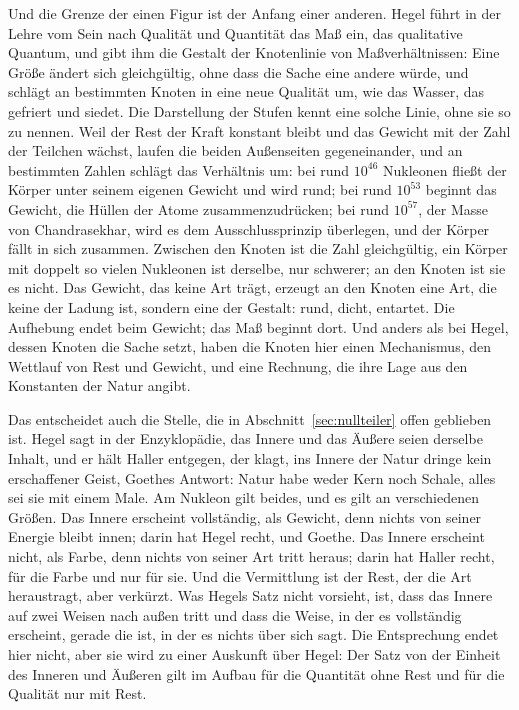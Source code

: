 \documentclass[11pt,a4paper]{article}
\newcommand{\Randlesart}{\marginpar{\raggedright\footnotesize\textcolor{lesart}{$\bigcirc$\,Lesart}}}
\begin{document}
\Randlesart Und die Grenze der einen Figur ist der Anfang einer anderen. Hegel führt in der Lehre vom Sein nach Qualität und Quantität das Maß ein, das qualitative Quantum, und gibt ihm die Gestalt der Knotenlinie von Maßverhältnissen: Eine Größe ändert sich gleichgültig, ohne dass die Sache eine andere würde, und schlägt an bestimmten Knoten in eine neue Qualität um, wie das Wasser, das gefriert und siedet. Die Darstellung der Stufen kennt eine solche Linie, ohne sie so zu nennen. Weil der Rest der Kraft konstant bleibt und das Gewicht mit der Zahl der Teilchen wächst, laufen die beiden Außenseiten gegeneinander, und an bestimmten Zahlen schlägt das Verhältnis um: bei rund $10^{46}$ Nukleonen fließt der Körper unter seinem eigenen Gewicht und wird rund; bei rund $10^{53}$ beginnt das Gewicht, die Hüllen der Atome zusammenzudrücken; bei rund $10^{57}$, der Masse von Chandrasekhar, wird es dem Ausschlussprinzip überlegen, und der Körper fällt in sich zusammen. Zwischen den Knoten ist die Zahl gleichgültig, ein Körper mit doppelt so vielen Nukleonen ist derselbe, nur schwerer; an den Knoten ist sie es nicht. Das Gewicht, das keine Art trägt, erzeugt an den Knoten eine Art, die keine der Ladung ist, sondern eine der Gestalt: rund, dicht, entartet. Die Aufhebung endet beim Gewicht; das Maß beginnt dort. Und anders als bei Hegel, dessen Knoten die Sache setzt, haben die Knoten hier einen Mechanismus, den Wettlauf von Rest und Gewicht, und eine Rechnung, die ihre Lage aus den Konstanten der Natur angibt.

Das entscheidet auch die Stelle, die in Abschnitt~\ref{sec:nullteiler} offen geblieben ist. Hegel sagt in der Enzyklopädie, das Innere und das Äußere seien derselbe Inhalt, und er hält Haller entgegen, der klagt, ins Innere der Natur dringe kein erschaffener Geist, Goethes Antwort: Natur habe weder Kern noch Schale, alles sei sie mit einem Male. Am Nukleon gilt beides, und es gilt an verschiedenen Größen. Das Innere erscheint vollständig, als Gewicht, denn nichts von seiner Energie bleibt innen; darin hat Hegel recht, und Goethe. Das Innere erscheint nicht, als Farbe, denn nichts von seiner Art tritt heraus; darin hat Haller recht, für die Farbe und nur für sie. Und die Vermittlung ist der Rest, der die Art heraustragt, aber verkürzt. Was Hegels Satz nicht vorsieht, ist, dass das Innere auf zwei Weisen nach außen tritt und dass die Weise, in der es vollständig erscheint, gerade die ist, in der es nichts über sich sagt. Die Entsprechung endet hier nicht, aber sie wird zu einer Auskunft über Hegel: Der Satz von der Einheit des Inneren und Äußeren gilt im Aufbau für die Quantität ohne Rest und für die Qualität nur mit Rest.
\end{document}
